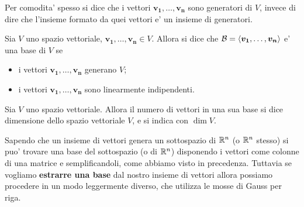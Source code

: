 Per comodita' spesso si dice che i vettori $\bm{v_1}, \dots, \bm{v_n}$ sono generatori di $V$, invece di dire che l'insieme formato da quei vettori e' un insieme di generatori.

\begin{definition}
    Sia $V$ uno spazio vettoriale, $\bm{v_1}, \dots, \bm{v_n} \in V$. Allora si dice che $\mathcal{B} = \left\langle \bm{v_1}, \dots, \bm{v_n} \right\rangle$ e' una base di $V$ se
    \begin{itemize}
        \item i vettori $\bm{v_1}, \dots, \bm{v_n}$ generano $V$;
        \item i vettori $\bm{v_1}, \dots, \bm{v_n}$ sono linearmente indipendenti.
    \end{itemize}
\end{definition}

\begin{definition}
    Sia $V$ uno spazio vettoriale. Allora il numero di vettori in una sua base si dice dimensione dello spazio vettoriale $V$, e si indica con $\dim V$.
\end{definition}

Sapendo che un insieme di vettori genera un sottospazio di $\mathbb{R}^n$ (o $\mathbb{R}^n$ stesso) si puo' trovare una base del sottospazio (o di $\mathbb{R}^n$) disponendo i vettori come colonne di una matrice e semplificandoli, come abbiamo visto in precedenza. Tuttavia se vogliamo \textbf{estrarre una base} dal nostro insieme di vettori allora possiamo procedere in un modo leggermente diverso, che utilizza le mosse di Gauss per riga.

